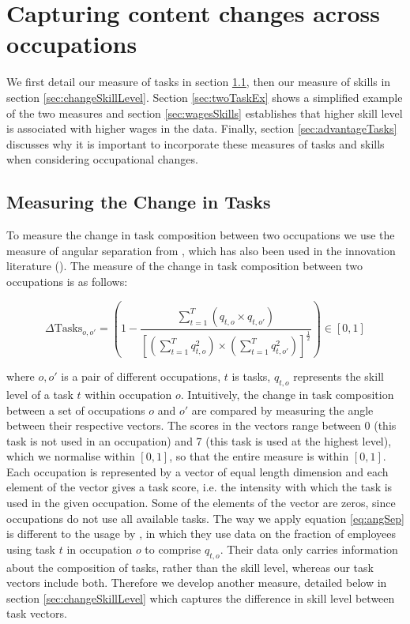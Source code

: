 \documentclass[preprint,12pt,authoryear]{elsarticle}
\begin{document}
\section{Capturing content changes across occupations}
\label{sec:measures}
We first detail our measure of tasks in section \ref{sec:taskDistance}, then our measure of skills in section \ref{sec:changeSkillLevel}. Section \ref{sec:twoTaskEx} shows a simplified example of the two measures and section \ref{sec:wagesSkills} establishes that higher skill level is associated with higher wages in the data. Finally, section \ref{sec:advantageTasks} discusses why it is important to incorporate these measures of tasks and skills when considering occupational changes.
\subsection{Measuring the Change in Tasks}
\label{sec:taskDistance}
To measure the change in task composition between two occupations we use the measure of angular separation from \cite{Gathmann2010}, which has also been used in the innovation literature (\cite{Jaffe1986}). The measure of the change in task composition between two occupations is as follows:


\begin{equation}
\label{eq:angSep}
\Delta \text{Tasks}_{o,o'} = \left(1 - \frac{\sum_{t=1}^{T}(q_{t,o}\times q_{t,o'})}{\left[(\sum_{t=1}^{T}q_{t,o}^{2})\times(\sum_{t=1}^{T}q_{t,o'}^{2})\right]^{\frac{1}{2}}}\right)   \in [0,1]
\end{equation}

\noindent where $o,o'$ is a pair of different occupations, $t$ is tasks, $q_{t,o}$ represents the skill level of a task $t$ within occupation $o$. Intuitively, the change in task composition between a set of occupations $o$ and $o'$ are compared by measuring the angle between their respective vectors. The scores in the vectors range between 0 (this task is not used in an occupation) and 7 (this task is used at the highest level), which we normalise within $[0,1]$, so that the entire measure is within $[0,1]$. Each occupation is represented by a vector of equal length dimension and each element of the vector gives a task score, i.e. the intensity with which the task is used in the given occupation. Some of the elements of the vector are zeros, since occupations do not use all available tasks. 
The way we apply equation \ref{eq:angSep} is different to the usage by \cite{Gathmann2010}, in which they use data on the fraction of employees using task $t$ in occupation $o$ to comprise $q_{t,o}$. Their data only carries information about the composition of tasks, rather than the skill level, whereas our task vectors include both. Therefore we develop another measure, detailed below in section \ref{sec:changeSkillLevel} which captures the difference in skill level between task vectors.
\end{document}
